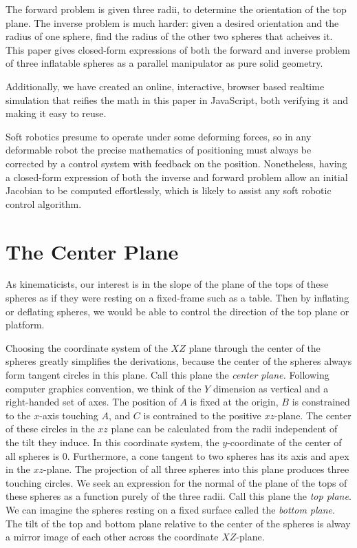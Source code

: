 \documentclass{article}
\begin{document}
The forward problem is given three radii,
to determine the orientation of the top plane.
The inverse problem is much harder: given a desired orientation and the radius of one
sphere, find the radius of the other two spheres that acheives it.
This paper gives closed-form expressions of both
the forward and inverse problem of three inflatable spheres as a parallel manipulator as pure solid geometry.

Additionally, we have created an online, interactive, browser based realtime simulation that reifies
the math in this paper in JavaScript, both verifying it and making it easy to reuse.

Soft robotics presume to operate under some deforming forces, so in any deformable robot the precise mathematics
of positioning must always be corrected by a control system with feedback on the position.
Nonetheless, having a closed-form expression of both the inverse and forward problem allow
an initial Jacobian to be computed effortlessly, which is likely to assist any soft robotic control algorithm.

\section{The Center Plane}

As kinematicists,
our interest is in the slope of the plane of the tops of these spheres
as if they were resting on a fixed-frame such as a table. Then by inflating or deflating spheres,
we would be able to control the direction of the top plane or platform.

Choosing the coordinate system of the $XZ$ plane through the center of the spheres greatly
simplifies the derivations, because the center of the spheres always form tangent circles
in this plane. Call this plane the {\em center plane.}
Following computer graphics convention, we think of the $Y$ dimension as vertical and a
right-handed set of axes.
The position of $A$ is fixed at the origin, $B$ is constrained to the $x$-axis touching $A$, and
$C$ is contrained to the positive $xz$-plane. The center of these circles in the $xz$ plane can be
calculated from the radii independent of the tilt they induce.
In this coordinate system, the $y$-coordinate of the center of all spheres is $0$.
Furthermore, a cone tangent to two spheres has its axis and apex in the $xz$-plane.
The projection of all three spheres into this plane produces three touching circles.
We seek an expression for the normal of the plane of the tops of these spheres as a function
purely of the three radii. Call this plane the {\em top plane}.
We can imagine the spheres resting on a fixed surface called the {\em bottom plane}.
The tilt of the top and bottom plane relative to the center of the spheres
is alway a mirror image of each other across the coordinate $XZ$-plane.
\end{document}
